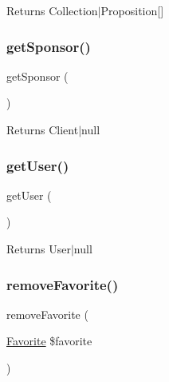 \begin{DoxyReturn}{Returns}
Collection$\vert$\+Proposition\mbox{[}\mbox{]} 
\end{DoxyReturn}
\mbox{\label{class_app_1_1_entity_1_1_client_a9ac0596c959dd68bde964b499a75cb8c}} 
\subsubsection{\texorpdfstring{getSponsor()}{getSponsor()}}
{\footnotesize\ttfamily get\+Sponsor (\begin{DoxyParamCaption}{ }\end{DoxyParamCaption})}

\begin{DoxyReturn}{Returns}
Client$\vert$null 
\end{DoxyReturn}
\mbox{\label{class_app_1_1_entity_1_1_client_ae81b7186fb97a7c6457edcc68c9aa2ef}} 
\subsubsection{\texorpdfstring{getUser()}{getUser()}}
{\footnotesize\ttfamily get\+User (\begin{DoxyParamCaption}{ }\end{DoxyParamCaption})}

\begin{DoxyReturn}{Returns}
User$\vert$null 
\end{DoxyReturn}
\mbox{\label{class_app_1_1_entity_1_1_client_af7ddb0058fa8b93c95254b1435a34f27}} 
\subsubsection{\texorpdfstring{removeFavorite()}{removeFavorite()}}
{\footnotesize\ttfamily remove\+Favorite (\begin{DoxyParamCaption}\item[{\mbox{\hyperlink{class_app_1_1_entity_1_1_favorite}{Favorite}}}]{\$favorite }\end{DoxyParamCaption})}


